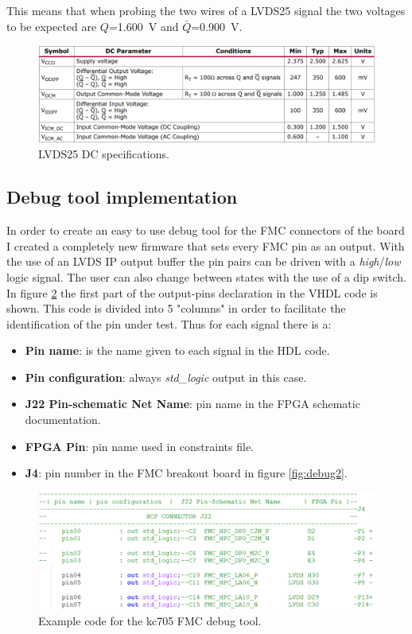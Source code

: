 This means that when probing the two wires of a LVDS25 signal the two voltages to be expected are $Q$=1.600~V and $\bar{Q}$=0.900~V.
\begin{figure}[H]
	\centering
	\includegraphics[width=0.8\linewidth]{IMG/ch3/LVDS25SPEC}
	\caption{LVDS25 DC specifications.}
	\label{fig:lvds25}
\end{figure}
\subsection{Debug tool implementation}
In order to create an easy to use debug tool for the FMC connectors of the board I created a completely new firmware that sets every FMC pin as an output.
With the use of an LVDS IP output buffer the pin pairs can be driven with a \textit{high}/\textit{low} logic signal.
The user can also change between states with the use of a dip switch.
In figure \ref{fig:debug1} the first part of the output-pins declaration in the VHDL code is shown.
This code is divided into 5 "columns" in order to facilitate the identification of the pin under test.
Thus for each signal there is a:
\begin{itemize}
	\item \textbf{Pin name}: is the name given to each signal in the HDL code.
	\item \textbf{Pin configuration}: always \textit{std\_logic} output in this case.
	\item \textbf{J22 Pin-schematic Net Name}: pin name in the FPGA schematic documentation. 
	\item \textbf{FPGA Pin}: pin name used in constraints file. 
	\item \textbf{J4}: pin number in the FMC breakout board in figure \ref{fig:debug2}. 
\end{itemize}     
\begin{figure}[H]
	\centering
	\includegraphics[width=0.8\linewidth]{IMG/ch3/DEBUG1}
	\caption{Example code for the kc705 FMC debug tool.}
	\label{fig:debug1}
\end{figure}
